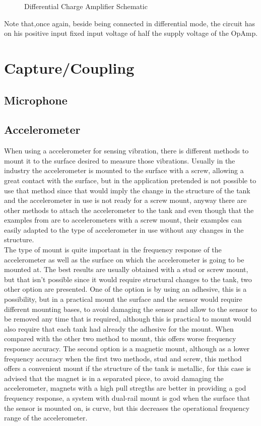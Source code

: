 \begin{figure}[!htb]
    \centering
    \caption{Differential Charge Amplifier Schematic}
    \label{fig:ChargeAmpDifSCH}
\end{figure}
Note that,once again, beside being connected in differential mode, the circuit has on his positive input fixed input voltage of half the supply voltage of the OpAmp.
\section{Capture/Coupling}
\subsection{Microphone}
\subsection{Accelerometer}
When using a accelerometer for sensing vibration, there is different methods to mount it to the surface desired to measure those vibrations. Usually in the industry the accelerometer is mounted to the surface with a screw, allowing a great contact with the surface, but in the application pretended is not possible to use that method since that would imply the change in the structure of the tank and the accelerometer in use is not ready for a screw mount, anyway there are other methods to attach the accelerometer to the tank and even though that the examples from \cite{GuidelinesMountingTest} are to accelerometers with a screw mount, their examples can easily adapted to the type of accelerometer in use without any changes in the structure.\\
The type of mount is quite important in the frequency response of the accelerometer as well as the surface on which the accelerometer is going to be mounted at. The best results are usually obtained with a stud or screw mount, but that isn't possible since it would require structural changes to the tank, two other option are presented. One of the option is by using an adhesive, this is a possibility, but in a practical mount the surface and the sensor would require different mounting bases, to avoid damaging the sensor and allow to the sensor to be removed any time that is required, although this is practical to mount would also require that each tank had already the adhesive for the mount. When compared with the other two method to mount, this offers worse frequency response accuracy. The second option is a magnetic mount, although as a lower frequency accuracy when the first two methods, stud and screw, this method offers a convenient mount if the structure of the tank is metallic, for this case is advised that the magnet is in a separated piece, to avoid damaging the accelerometer, magnets with a high pull stregths are better in providing a god frequency response, a system with dual-rail mount is god when the surface that the sensor is mounted on, is curve, but this decreases the operational frequency range of the accelerometer.\\

